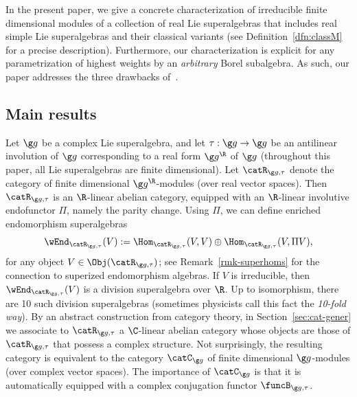 \documentclass[12pt]{amsart}
\begin{document}
 
In the present paper, we give a concrete characterization of irreducible finite dimensional modules of 
a collection  of real Lie superalgebras 
that includes  real simple Lie superalgebras and their classical variants (see Definition~\ref{dfn:classM} for a precise description). 
Furthermore,  
our characterization is explicit for any parametrization of highest weights by an \emph{arbitrary} Borel subalgebra. As such, our paper addresses the three drawbacks of~\cite{Hayashi}.


\subsection{Main results}
 Let $\g g$ be a  complex Lie superalgebra, and let  $\tau:\g g\to\g g$ be an antilinear involution of $\g g$ corresponding to a real form $\g g^\R$ of $\g g$ (throughout this paper, all Lie superalgebras are finite dimensional). Let $\catR_{\g g,\tau}$ denote the category of finite dimensional 
$\g g^\R$-modules (over real vector spaces). Then $\catR_{\g g,\tau}$ is an $\R$-linear abelian category, equipped with an $\R$-linear involutive endofunctor $\Pi$, namely the parity change.  Using $\Pi$, we can define enriched endomorphism superalgebras 
\[
\wEnd_{\catR_{\g g,\tau}}(V):=
\Hom_{\catR_{\g g,\tau}}(V,V)\oplus 
\Hom_{\catR_{\g g,\tau}}(V,\Pi V),
\]
for any object $V\in\Obj(\catR_{\g g,\tau})$; see Remark~\ref{rmk-superhoms} for the connection to superized endomorphism algebras.
If $V$ is irreducible, then $\wEnd_{\catR_{\g g,\tau}}(V)$ is a division superalgebra over $\R$. Up to isomorphism, there are 10 such division superalgebras (sometimes physicists call this fact the \emph{10-fold way}). 
By an abstract construction from category theory, in Section~\ref{sec:cat-gener} we associate to  $\catR_{\g g,\tau}$  a $\C$-linear abelian category whose objects are those of $\catR_{\g g,\tau}$ that possess a complex structure. 
Not surprisingly, the resulting category is equivalent to the category $\catC_{\g g}$ of finite dimensional $\g g$-modules (over complex vector spaces). The importance of $\catC_{\g g}$ is that it is automatically equipped with a complex conjugation functor $\funcB_{\g g,\tau}$. 
\end{document}
